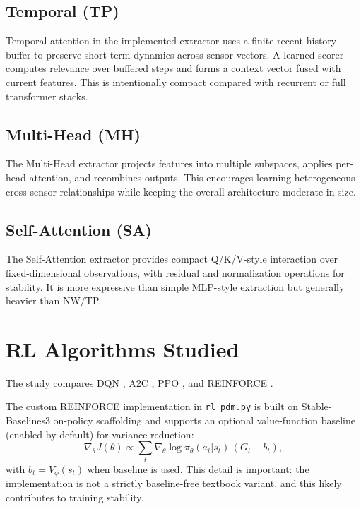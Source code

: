 \documentclass[11pt]{article}
\begin{document}
\subsection{Temporal (TP)}
Temporal attention in the implemented extractor uses a finite recent history buffer to preserve short-term dynamics across sensor vectors. A learned scorer computes relevance over buffered steps and forms a context vector fused with current features. This is intentionally compact compared with recurrent or full transformer stacks.

\subsection{Multi-Head (MH)}
The Multi-Head extractor projects features into multiple subspaces, applies per-head attention, and recombines outputs. This encourages learning heterogeneous cross-sensor relationships \citep{Vaswani2017Attention} while keeping the overall architecture moderate in size.

\subsection{Self-Attention (SA)}
The Self-Attention extractor provides compact Q/K/V-style interaction over fixed-dimensional observations, with residual and normalization operations for stability. It is more expressive than simple MLP-style extraction but generally heavier than NW/TP.

\section{RL Algorithms Studied}
The study compares \textsc{DQN} \citep{Mnih2015DQN}, \textsc{A2C} \citep{Mnih2016A3C}, \textsc{PPO} \citep{Schulman2017PPO}, and \textsc{REINFORCE} \citep{Williams1992REINFORCE}.

The custom \textsc{REINFORCE} implementation in \texttt{rl\_pdm.py} is built on Stable-Baselines3 on-policy scaffolding and supports an optional value-function baseline (enabled by default) for variance reduction:
\begin{equation}
\nabla_\theta J(\theta)\propto
\sum_t \nabla_\theta\log\pi_\theta(a_t|s_t)\,(G_t-b_t),
\end{equation}
with $b_t=V_\phi(s_t)$ when baseline is used. This detail is important: the implementation is not a strictly baseline-free textbook variant, and this likely contributes to training stability.
\end{document}
